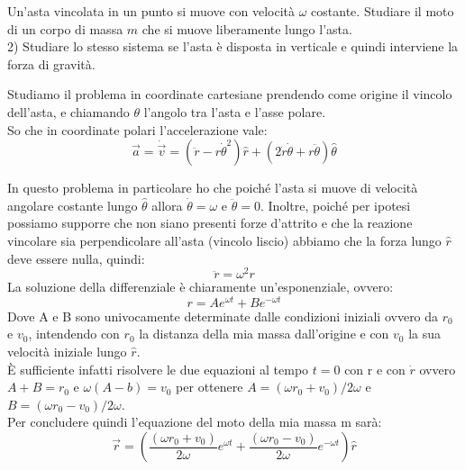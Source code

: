 \documentclass[../main.tex]{subfiles}
\begin{document}

\textex
Un'asta vincolata in un punto si muove con velocità $\omega$ costante. Studiare il moto di un corpo di massa $m$ che si muove liberamente lungo l'asta. \\
2) Studiare lo stesso sistema se l'asta è disposta in verticale e quindi interviene la forza di gravità.

\solution
Studiamo il problema in coordinate cartesiane prendendo come origine il vincolo dell'asta, e chiamando $\theta$ l'angolo tra l'asta e l'asse polare. \\
So che in coordinate polari l'accelerazione vale: 
\begin{equation}\label{avr:1}
	\overrightarrow{a}=\dot{\overrightarrow{v}} =(\ddot{r}-r\dot{\theta}^2)\hat{r}+(2\dot{r}\dot{\theta}+r\ddot{\theta})\hat{\theta}
\end{equation}

In questo problema in particolare ho che poiché l'asta si muove di velocità angolare costante lungo  $\hat{\theta}$ allora
 $\dot{\theta}=\omega$ e $\ddot{\theta}=0$. Inoltre, poiché per ipotesi possiamo supporre che non siano presenti forze d'attrito e che la reazione vincolare sia 
 perpendicolare all'asta (vincolo liscio) abbiamo che la forza lungo $\hat{r}$ deve essere nulla, quindi:
 \begin{equation}\label{avr:2}
  \ddot{r}=\omega^2r
 \end{equation}
La soluzione della differenziale è chiaramente un'esponenziale, ovvero:
\begin{equation}\label{avr:3}
 r=Ae^{\omega t}+Be^{-\omega t}
\end{equation}
Dove A e B sono univocamente determinate dalle condizioni iniziali ovvero da $r_0$ e $v_0$, intendendo con $r_0$ la distanza della mia massa dall'origine
e con $v_0$ la sua velocità iniziale lungo $\hat{r}$. \\
\`{E} sufficiente infatti risolvere le due equazioni al tempo $t=0$ con r e con $\dot{r}$ ovvero $A+B=r_0$ e $\omega(A-b)=v_0$ per ottenere $A={(\omega r_0 +
v_0)}/{2\omega}$ e $B={(\omega r_0 -v_0)}/{2\omega}$.\\
Per concludere quindi l'equazione del moto della mia massa m sarà:
\begin{equation}
 \overrightarrow{r}=\left(\frac{(\omega r_0 +v_0)}{2\omega}e^{\omega t}+\frac{(\omega r_0 -v_0)}{2\omega}e^{-\omega t}\right)\hat{r}
\end{equation}
\end{document}
